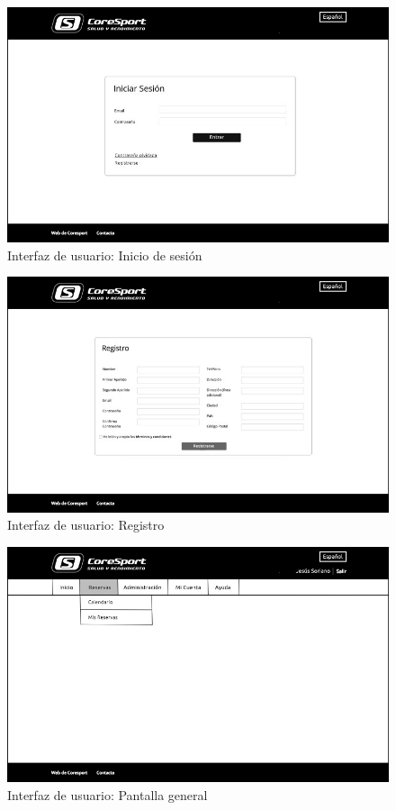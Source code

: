 \begin{figure}
\centering
  \includegraphics[scale=.40]{img/interfaz/inicio-sesion.jpg}
  \caption{Interfaz de usuario: Inicio de sesión}
  \label{fig:interfaz-inicio-sesion}
\end{figure}

\begin{figure}
\centering
  \includegraphics[scale=.40]{img/interfaz/registro.jpg}
  \caption{Interfaz de usuario: Registro}
  \label{fig:interfaz-registro}
\end{figure}

\begin{figure}
\centering
  \includegraphics[scale=.40]{img/interfaz/pantalla-principal.jpg}
  \caption{Interfaz de usuario: Pantalla general}
  \label{fig:interfaz-pantalla-principal}
\end{figure}

